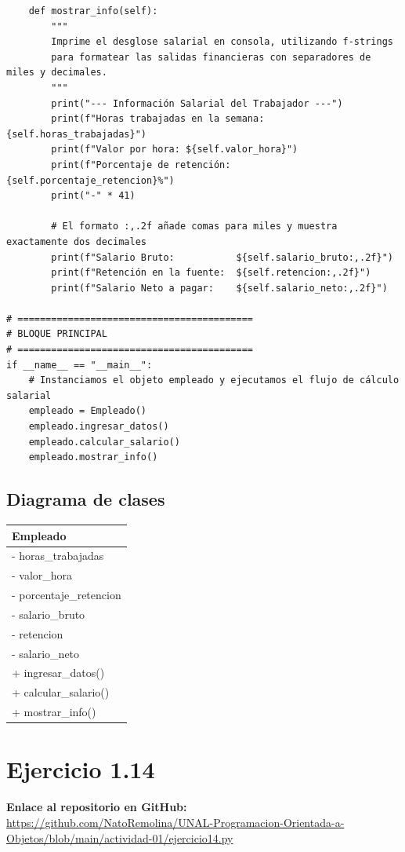 \documentclass[11pt, a4paper]{article}
\newcommand{\clasebox}[3]{%
\begin{center}
\begin{tabular}{|l|}
\hline
\textbf{#1} \\
\hline
#2
\hline
#3
\hline
\end{tabular}
\end{center}
}
\begin{document}
\begin{lstlisting}
    def mostrar_info(self):
        """
        Imprime el desglose salarial en consola, utilizando f-strings 
        para formatear las salidas financieras con separadores de miles y decimales.
        """
        print("--- Información Salarial del Trabajador ---")
        print(f"Horas trabajadas en la semana: {self.horas_trabajadas}")
        print(f"Valor por hora: ${self.valor_hora}")
        print(f"Porcentaje de retención: {self.porcentaje_retencion}%")
        print("-" * 41)
        
        # El formato :,.2f añade comas para miles y muestra exactamente dos decimales
        print(f"Salario Bruto:           ${self.salario_bruto:,.2f}")
        print(f"Retención en la fuente:  ${self.retencion:,.2f}")
        print(f"Salario Neto a pagar:    ${self.salario_neto:,.2f}")

# ==========================================
# BLOQUE PRINCIPAL
# ==========================================
if __name__ == "__main__":
    # Instanciamos el objeto empleado y ejecutamos el flujo de cálculo salarial
    empleado = Empleado()
    empleado.ingresar_datos()
    empleado.calcular_salario()
    empleado.mostrar_info()
\end{lstlisting}

\subsection{Diagrama de clases}
\clasebox{Empleado}
{%
- horas\_trabajadas \\
- valor\_hora \\
- porcentaje\_retencion \\
- salario\_bruto \\
- retencion \\
- salario\_neto \\
}
{%
+ ingresar\_datos() \\
+ calcular\_salario() \\
+ mostrar\_info() \\
}

\newpage
\section{Ejercicio 1.14}

\noindent \textbf{Enlace al repositorio en GitHub:} \\
\url{https://github.com/NatoRemolina/UNAL-Programacion-Orientada-a-Objetos/blob/main/actividad-01/ejercicio14.py}
\end{document}
